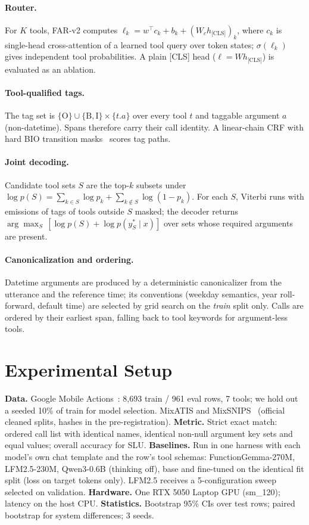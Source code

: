 \documentclass[11pt]{article}
\begin{document}
\paragraph{Router.} For $K$ tools, FAR-v2 computes $\ell_k = w^\top c_k + b_k + (W_c h_{\text{[CLS]}})_k$,
where $c_k$ is single-head cross-attention of a learned tool query over token states; $\sigma(\ell_k)$ gives
independent tool probabilities. A plain [CLS] head ($\ell = W h_{\text{[CLS]}}$) is evaluated as an ablation.
\paragraph{Tool-qualified tags.} The tag set is $\{\text{O}\}\cup\{\text{B},\text{I}\}\times\{t.a\}$ over
every tool $t$ and taggable argument $a$ (non-datetime). Spans therefore carry their call identity.
A linear-chain CRF with hard BIO transition masks~\cite{crf} scores tag paths.
\paragraph{Joint decoding.} Candidate tool sets $S$ are the top-$k$ subsets under
$\log p(S)=\sum_{k\in S}\log p_k+\sum_{k\notin S}\log(1-p_k)$. For each $S$, Viterbi runs with emissions of
tags of tools outside $S$ masked; the decoder returns
$\arg\max_S\,[\log p(S)+\log p(y^*_S\mid x)]$ over sets whose required arguments are present.
\paragraph{Canonicalization and ordering.} Datetime arguments are produced by a deterministic
canonicalizer from the utterance and the reference time; its conventions (weekday semantics, year
roll-forward, default time) are selected by grid search on the \emph{train} split only. Calls are ordered by
their earliest span, falling back to tool keywords for argument-less tools.

\section{Experimental Setup}
\textbf{Data.} Google Mobile Actions~\cite{mobileactions}: 8,693 train / 961 eval rows, 7 tools; we hold out a
seeded 10\% of train for model selection. MixATIS and MixSNIPS~\cite{agif} (official cleaned splits, hashes in
the pre-registration). \textbf{Metric.} Strict exact match: ordered call list with identical names, identical
non-null argument key sets and equal values; overall accuracy for SLU.
\textbf{Baselines.} Run in one harness with each model's own chat template and the row's tool schemas:
FunctionGemma-270M, LFM2.5-230M, Qwen3-0.6B (thinking off), base and fine-tuned on the identical fit split
(loss on target tokens only). LFM2.5 receives a 5-configuration sweep selected on validation.
\textbf{Hardware.} One RTX 5050 Laptop GPU (sm\_120); latency on the host CPU.
\textbf{Statistics.} Bootstrap 95\% CIs over test rows; paired bootstrap for system differences; 3 seeds.
\end{document}
